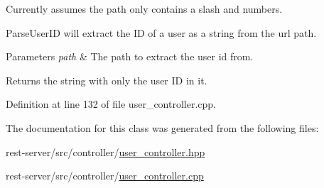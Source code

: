 Currently assumes the path only contains a slash and numbers.

Parse\+User\+ID will extract the ID of a user as a string from the url path.


\begin{DoxyParams}{Parameters}
{\em path} & The path to extract the user id from. \\
\hline
\end{DoxyParams}
\begin{DoxyReturn}{Returns}
the string with only the user ID in it. 
\end{DoxyReturn}


Definition at line 132 of file user\+\_\+controller.\+cpp.



The documentation for this class was generated from the following files\+:\begin{DoxyCompactItemize}
\item 
rest-\/server/src/controller/\mbox{\hyperlink{user__controller_8hpp}{user\+\_\+controller.\+hpp}}\item 
rest-\/server/src/controller/\mbox{\hyperlink{user__controller_8cpp}{user\+\_\+controller.\+cpp}}\end{DoxyCompactItemize}

